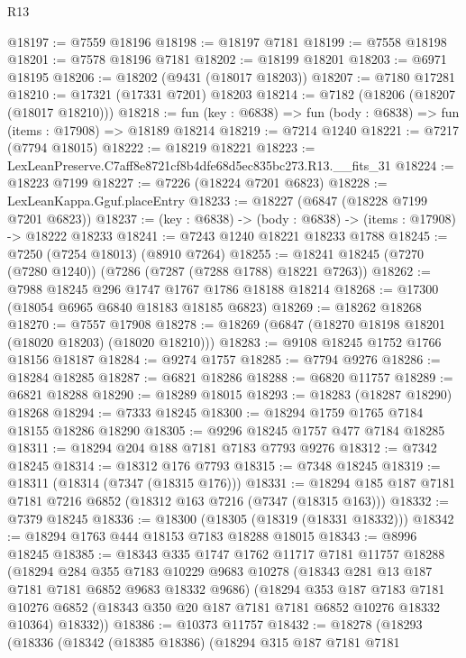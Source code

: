 \begin{lexlean}{R13}
\begin{coremodule}
@18197 := @7559 @18196
@18198 := @18197 @7181
@18199 := @7558 @18198
@18201 := @7578 @18196 @7181
@18202 := @18199 @18201
@18203 := @6971 @18195
@18206 := @18202 (@9431 (@18017 @18203))
@18207 := @7180 @17281
@18210 := @17321 (@17331 @7201) @18203
@18214 := @7182 (@18206 (@18207 (@18017 @18210)))
@18218 := fun (key : @6838) => fun (body : @6838) => fun (items : @17908) => @18189 @18214
@18219 := @7214 @1240
@18221 := @7217 (@7794 @18015)
@18222 := @18219 @18221
@18223 := LexLeanPreserve.C7aff8e8721cf8b4dfe68d5ec835bc273.R13.__fits_31
@18224 := @18223 @7199
@18227 := @7226 (@18224 @7201 @6823)
@18228 := LexLeanKappa.Gguf.placeEntry
@18233 := @18227 (@6847 (@18228 @7199 @7201 @6823))
@18237 := (key : @6838) -> (body : @6838) -> (items : @17908) -> @18222 @18233
@18241 := @7243 @1240 @18221 @18233 @1788
@18245 := @7250 (@7254 @18013) (@8910 @7264)
@18255 := @18241 @18245 (@7270 (@7280 @1240)) (@7286 (@7287 (@7288 @1788) @18221 @7263))
@18262 := @7988 @18245 @296 @1747 @1767 @1786 @18188 @18214
@18268 := @17300 (@18054 @6965 @6840 @18183 @18185 @6823)
@18269 := @18262 @18268
@18270 := @7557 @17908
@18278 := @18269 (@6847 (@18270 @18198 @18201 (@18020 @18203) (@18020 @18210)))
@18283 := @9108 @18245 @1752 @1766 @18156 @18187
@18284 := @9274 @1757
@18285 := @7794 @9276
@18286 := @18284 @18285
@18287 := @6821 @18286
@18288 := @6820 @11757
@18289 := @6821 @18288
@18290 := @18289 @18015
@18293 := @18283 (@18287 @18290) @18268
@18294 := @7333 @18245
@18300 := @18294 @1759 @1765 @7184 @18155 @18286 @18290
@18305 := @9296 @18245 @1757 @477 @7184 @18285
@18311 := @18294 @204 @188 @7181 @7183 @7793 @9276
@18312 := @7342 @18245
@18314 := @18312 @176 @7793
@18315 := @7348 @18245
@18319 := @18311 (@18314 (@7347 (@18315 @176)))
@18331 := @18294 @185 @187 @7181 @7181 @7216 @6852 (@18312 @163 @7216 (@7347 (@18315 @163)))
@18332 := @7379 @18245
@18336 := @18300 (@18305 (@18319 (@18331 @18332)))
@18342 := @18294 @1763 @444 @18153 @7183 @18288 @18015
@18343 := @8996 @18245
@18385 := @18343
    @335
    @1747
    @1762
    @11717
    @7181
    @11757
    @18288
    (@18294
      @284
      @355
      @7183
      @10229
      @9683
      @10278
      (@18343 @281 @13 @187 @7181 @7181 @6852 @9683 @18332 @9686)
      (@18294
        @353
        @187
        @7183
        @7181
        @10276
        @6852
        (@18343 @350 @20 @187 @7181 @7181 @6852 @10276 @18332 @10364)
        @18332))
@18386 := @10373 @11757
@18432 := @18278
    (@18293
      (@18336
        (@18342
          (@18385 @18386)
          (@18294
            @315
            @187
            @7181
            @7181

\end{coremodule}
\end{lexlean}
